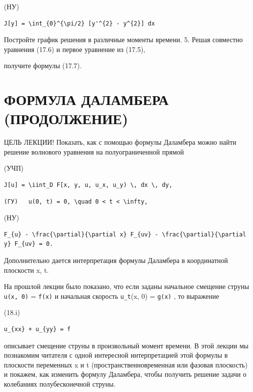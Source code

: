 \documentclass[
  ukrainian,
]{article}
\begin{document}
(НУ)

\begin{verbatim}
J[y] = \int_{0}^{\pi/2} [y'^{2} - y^{2}] dx
\end{verbatim}

Постройте график решения в различные моменты времени. 5. Решая совместно
уравнения (17.6) и первое уравнение из (17.5),

получите формулы (17.7).

\section{ФОРМУЛА ДАЛАМБЕРА
(ПРОДОЛЖЕНИЕ)}\label{ux444ux43eux440ux43cux443ux43bux430-ux434ux430ux43bux430ux43cux431ux435ux440ux430-ux43fux440ux43eux434ux43eux43bux436ux435ux43dux438ux435}

ЦЕЛЬ ЛЕКЦИИ! Показать, как с помощью формулы Даламбера можно найти
решение волнового уравнения на полуограниченной прямой

(УЧП)

\begin{verbatim}
J[u] = \iint_D F[x, y, u, u_x, u_y) \, dx \, dy,
\end{verbatim}

\begin{verbatim}
(ГУ)   u(0, t) = 0, \quad 0 < t < \infty,
\end{verbatim}

(НУ)

\begin{verbatim}
F_{u} - \frac{\partial}{\partial x} F_{uv} - \frac{\partial}{\partial y} F_{uv} = 0.
\end{verbatim}

Дополнительно дается интерпретация формулы Даламбера в координатной
плоскости x, t.

На прошлой лекции было показано, что если заданы начальное смещение
струны \texttt{u(x,\ 0)} = \texttt{f(x)} и начальная скорость
\texttt{u\_t}(x, 0) = \texttt{g(x)} , то выражение

(18.i)

\begin{verbatim}
u_{xx} + u_{yy} = f
\end{verbatim}

описывает смещение струны в произвольный момент времени. В этой лекции
мы познакомим читателя с одной интересной интерпретацией этой формулы в
плоскости переменных x и t (пространственновременная или фазовая
плоскость) и покажем, как изменить формулу Даламбера, чтобы получить
решение задачи о колебаниях полубесконечной струны.
\end{document}
